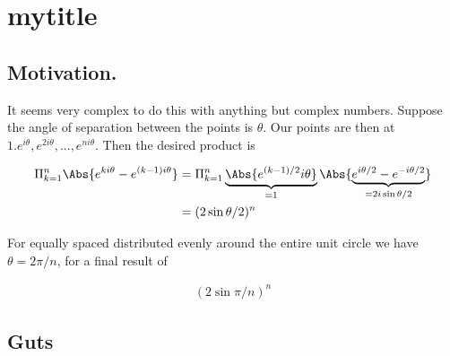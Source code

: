 
%

\chapter{mytitle}
\label{chap:template}
{}
\date{June X, 2010}

\beginArtWithToc

\section{Motivation.}

It seems very complex to do this with anything but complex numbers.  Suppose the angle of separation between the points is $\theta$.  Our points are then at $1. e^{i\theta}, e^{2i\theta}, ..., e^{n i \theta}$.  Then the desired product is

\begin{align*}
\Pi_{k=1}^n \Abs{ e^{k i \theta} - e^{(k-1)i\theta} } 
&=
\Pi_{k=1}^n \underbrace{\Abs{ e^{(k-1)/2}i \theta} }_{=1} \Abs{ \underbrace{e^{i \theta/2} - e^{-i\theta/2}}_{= 2i \sin\theta/2} } \\
&= (2 \sin\theta/2)^n
\end{align*}

For equally spaced distributed evenly around the entire unit circle we have $\theta = 2 \pi/n$, for a final result of

\begin{align*}
(2 \sin \pi/n)^n
\end{align*}

\section{Guts}

\EndArticle

